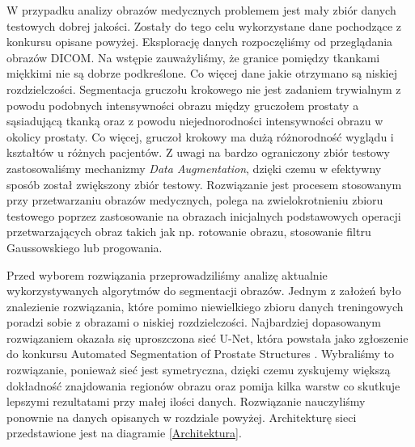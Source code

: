 \documentclass[a4paper,11pt,twoside]{report}
\theoremstyle{definition}
\begin{document}
W przypadku analizy obrazów medycznych problemem jest mały zbiór danych testowych dobrej jakości. Zostały do tego celu wykorzystane dane pochodzące z konkursu opisane powyżej. Eksplorację danych rozpoczęliśmy od przeglądania obrazów DICOM. Na wstępie zauważyliśmy, że granice pomiędzy tkankami miękkimi nie są dobrze podkreślone. Co więcej dane jakie otrzymano są niskiej rozdzielczości. Segmentacja gruczołu krokowego nie jest zadaniem trywialnym z powodu podobnych intensywności obrazu między gruczołem prostaty a sąsiadującą tkanką oraz z powodu niejednorodności intensywności obrazu w okolicy prostaty. Co więcej, gruczoł krokowy ma dużą różnorodność wyglądu i kształtów u różnych pacjentów.
Z uwagi na bardzo ograniczony zbiór testowy zastosowaliśmy mechanizmy \textit{Data Augmentation}, dzięki czemu w efektywny sposób został zwiększony zbiór testowy. Rozwiązanie jest  procesem stosowanym przy przetwarzaniu obrazów medycznych, polega na zwielokrotnieniu zbioru testowego poprzez zastosowanie na obrazach inicjalnych podstawowych operacji przetwarzających obraz takich jak np. rotowanie obrazu, stosowanie filtru Gaussowskiego lub progowania.
\par
Przed wyborem rozwiązania przeprowadziliśmy analizę aktualnie wykorzystywanych algorytmów do segmentacji obrazów. Jednym z założeń było znalezienie rozwiązania, które pomimo niewielkiego zbioru danych treningowych poradzi sobie z obrazami o niskiej rozdzielczości. Najbardziej dopasowanym rozwiązaniem okazała się uproszczona sieć U-Net, która powstała jako zgłoszenie do konkursu Automated Segmentation of Prostate Structures \cite{zgloszenie}. Wybraliśmy to rozwiązanie, ponieważ sieć jest symetryczna, dzięki czemu zyskujemy większą dokładność znajdowania regionów obrazu oraz pomija kilka warstw co skutkuje lepszymi rezultatami przy małej ilości danych. Rozwiązanie nauczyliśmy ponownie na danych opisanych w rozdziale powyżej. Architekturę sieci przedstawione jest na diagramie \ref{Architektura}. 
\end{document}
